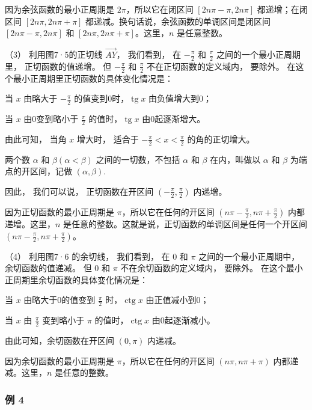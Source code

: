 因为余弦函数的最小正周期是 \(2\pi\)，所以它在闭区间
\([2n\pi - \pi, 2n\pi]\) 都递增；在闭区间 \([2n\pi, 2n\pi + \pi]\)
都递减。换句话说，余弦函数的单调区间是闭区间 \([2n\pi - \pi, 2n\pi]\) 和
\([2n\pi, 2n\pi + \pi]\)。这里，\(n\) 是任意整数。

（3） 利用图7·5的正切线 \(\overrightarrow{AY}\)， 我们看到， 在
\(-\frac{\pi}{2}\) 和 \(\frac{\pi}{2}\) 之间的一个最小正周期里，
正切函数的值递增。 但 \(-\frac{\pi}{2}\) 和 \(\frac{\pi}{2}\)
不在正切函数的定义域内， 要除外。
在这个最小正周期里正切函数的具体变化情况是：

当 \(x\) 由略大于 \(-\frac{\pi}{2}\)
的值变到0时，\(\operatorname{tg} x\) 由负值增大到0；

当 \(x\) 由0变到略小于 \(\frac{\pi}{2}\) 的值时，\(\operatorname{tg} x\)
由0起逐渐增大。

由此可知， 当角 \(x\) 增大时， 适合于
\(-\frac{\pi}{2} < x < \frac{\pi}{2}\) 的角的正切增大。

两个数 \(\alpha\) 和 \(\beta (\alpha < \beta)\) 之间的一切数，不包括
\(\alpha\) 和 \(\beta\) 在内，叫做以 \(\alpha\) 和 \(\beta\)
为端点的开区间，记做 \((\alpha, \beta)\).

因此， 我们可以说， 正切函数在开区间
\(\left(-\frac{\pi}{2}, \frac{\pi}{2}\right)\) 内递增。

因为正切函数的最小正周期是 \(\pi\)，所以它在任何的开区间
\(\left(n\pi - \frac{\pi}{2}, n\pi + \frac{\pi}{2}\right)\)
内都递增。这里，\(n\)
是任意的整数。这就是说，正切函数的单调区间是任何一个开区间
\(\left(n\pi - \frac{\pi}{2}, n\pi + \frac{\pi}{2}\right)\)。

（4） 利用图7·6 的余切线， 我们看到， 在 0 和 \(\pi\)
之间的一个最小正周期中， 余切函数的值递减。 但 0 和 \(\pi\)
不在余切函数的定义域内， 要除外。
在这个最小正周期里余切函数的具体变化情况是：

当 \(x\) 由略大于0的值变到 \(\frac{\pi}{2}\)
时，\(\operatorname{ctg} x\) 由正值减小到0；

当 \(x\) 由 \(\frac{\pi}{2}\) 变到略小于 \(\pi\)
的值时，\(\operatorname{ctg} x\) 由0起逐渐减小。

由此可知，余切函数在开区间 \((0,\pi)\) 内递减。

因为余切函数的最小正周期是 \(\pi\)，所以它在任何的开区间
\((n\pi, n\pi + \pi)\) 内都递减。这里，\(n\) 是任意的整数。

\subsubsection{例 4}

